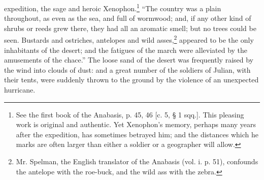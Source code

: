 expedition, the sage and heroic Xenophon.\footnote{See the first book of the Anabasis, p. 45, 46 [c. 5, § 1 sqq.]. This pleasing work is original and authentic. Yet Xenophon\texthebrew{}’s memory, perhaps many years after the expedition, has sometimes betrayed him; and the distances which he marks are often larger than either a soldier or a geographer will allow.} \texthebrew{“}The country was a plain throughout, as even as the sea, and full of wormwood; and, if any other kind of shrubs or reeds grew there, they had all an aromatic smell; but no trees could be seen. Bustards and ostriches, antelopes and wild asses,\footnote{Mr. Spelman, the English translator of the Anabasis (vol. i. p. 51), confounds the antelope with the roe-buck, and the wild ass with the zebra.} appeared to be the only inhabitants of the desert; and the fatigues of the march were alleviated by the amusements of the chace.\texthebrew{}” The loose sand of the desert was frequently raised by the wind into clouds of dust: and a great number of the soldiers of Julian, with their tents, were suddenly thrown to the ground by the violence of an unexpected hurricane.

